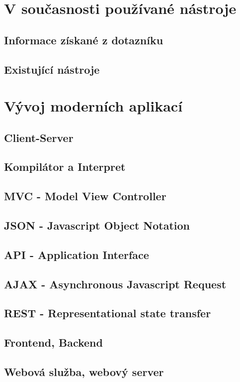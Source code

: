 \documentclass[14pt,a4paper]{article}
\begin{document}
    \section{V současnosti používané nástroje}
        \subsection{Informace získané z dotazníku}
        \subsection{Existující nástroje}
	
    \section{Vývoj moderních aplikací}
        \subsection{Client-Server}
        \subsection{Kompilátor a Interpret}
        \subsection{MVC - Model View Controller}
        \subsection{JSON - Javascript Object Notation}
        \subsection{API - Application Interface}
        \subsection{AJAX - Asynchronous Javascript Request}
        \subsection{REST - Representational state transfer}
        \subsection{Frontend, Backend}
        \subsection{Webová služba, webový server}
\end{document}
